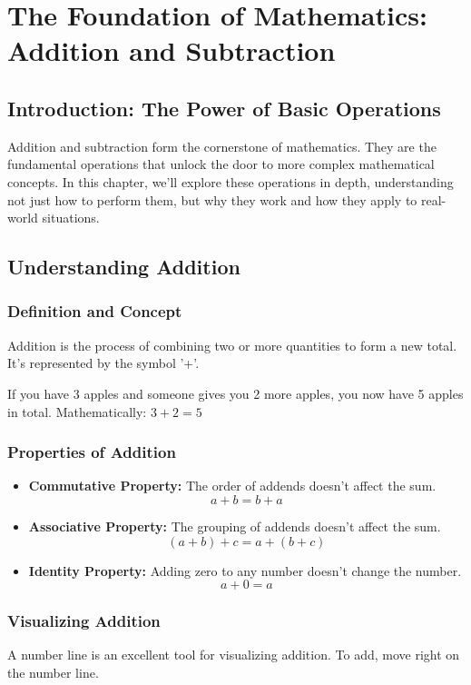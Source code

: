 \chapter{The Foundation of Mathematics: Addition and Subtraction}

\section{Introduction: The Power of Basic Operations}
Addition and subtraction form the cornerstone of mathematics. They are the fundamental operations that unlock the door to more complex mathematical concepts. In this chapter, we'll explore these operations in depth, understanding not just how to perform them, but why they work and how they apply to real-world situations.

\section{Understanding Addition}
\subsection{Definition and Concept}
Addition is the process of combining two or more quantities to form a new total. It's represented by the symbol '+'.

\begin{example}
If you have 3 apples and someone gives you 2 more apples, you now have 5 apples in total.
Mathematically: $3 + 2 = 5$
\end{example}

\subsection{Properties of Addition}
\begin{itemize}
    \item \textbf{Commutative Property:} The order of addends doesn't affect the sum.
    \[ a + b = b + a \]
    \item \textbf{Associative Property:} The grouping of addends doesn't affect the sum.
    \[ (a + b) + c = a + (b + c) \]
    \item \textbf{Identity Property:} Adding zero to any number doesn't change the number.
    \[ a + 0 = a \]
\end{itemize}

\subsection{Visualizing Addition}
A number line is an excellent tool for visualizing addition. To add, move right on the number line.

